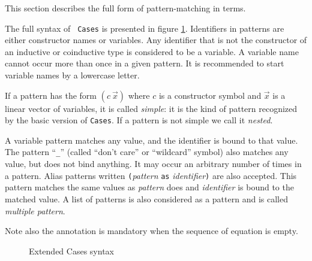 {}

\label{Mult-Cases-full}

This section describes the full form of pattern-matching in {\Coq} terms.

\label{implementation} The full syntax of {\tt
Cases} is presented in figure \ref{cases-grammar}.  Identifiers in
patterns are either constructor names or variables. Any identifier
that is not the constructor of an inductive or coinductive type is
considered to be a variable. A variable name cannot occur more than
once in a given pattern. It is recommended to start variable names by
a lowercase letter.

If a pattern has the form $(c~\vec{x})$ where $c$ is a constructor
symbol and $\vec{x}$ is a linear vector of variables, it is called
{\em simple}: it is the kind of pattern recognized by the basic
version of {\tt Cases}. If a pattern is
not simple we call it {\em nested}.

A variable pattern matches any value, and the identifier is bound to
that value. The pattern ``\texttt{\_}'' (called ``don't care'' or
``wildcard'' symbol) also matches any value, but does not bind anything. It
may occur an arbitrary number of times in a pattern. Alias patterns
written \texttt{(}{\sl pattern} \texttt{as} {\sl identifier}\texttt{)} are
also accepted. This pattern matches the same values as {\sl pattern}
does and {\sl identifier} is bound to the matched value.  A list of
patterns is also considered as a pattern and is called {\em multiple
pattern}.

Note also the annotation is mandatory when the sequence of equation is
empty.

\begin{figure}[t]
\caption{Extended Cases syntax}
\label{cases-grammar}
\end{figure}

